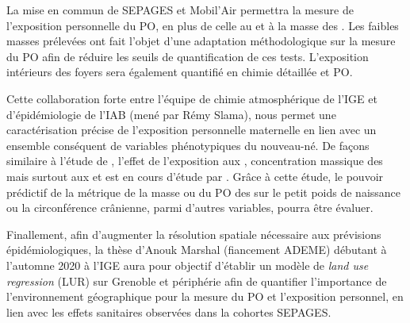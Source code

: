 La mise en commun de SEPAGES et Mobil'Air permettra la mesure de l'exposition personnelle
du PO, en plus de celle au  et à la masse des \PMdc. Les faibles masses prélevées
ont fait l'objet d'une adaptation méthodologique sur la mesure du PO afin de réduire les
seuils de quantification de ces tests.
L'exposition intérieurs des foyers sera également quantifié en chimie détaillée et PO.

Cette collaboration forte entre l'équipe de chimie atmosphérique de l'IGE et
d'épidémiologie de l'IAB (mené par Rémy Slama), nous permet une caractérisation précise de
l'exposition personnelle maternelle en lien avec un ensemble conséquent de variables
phénotypiques du nouveau-né.
De façons similaire à l'étude de \cite{ouidirEstimation2015}, l'effet de l'exposition aux
, concentration massique des \PMdc{} mais surtout aux \POAAv{} et \PODTTv{} est en
cours d'étude par \cite{borlazaPersonalinprep.}.
Grâce à cette étude, le pouvoir prédictif de la métrique de la masse ou du PO des \PMdc{}
sur le petit poids de naissance ou la circonférence crânienne, parmi d'autres variables,
pourra être évaluer.

Finallement, afin d'augmenter la résolution spatiale nécessaire aux prévisions
épidémiologiques, la thèse d'Anouk Marshal (fiancement ADEME) débutant à l'automne 2020 à
l'IGE aura pour objectif d'établir un modèle de \textit{land use regression} (LUR) sur
Grenoble et périphérie afin de quantifier l'importance de l'environnement géographique
pour la mesure du PO et l'exposition personnel, en lien avec les effets sanitaires
observées dans la cohortes SEPAGES.

%


